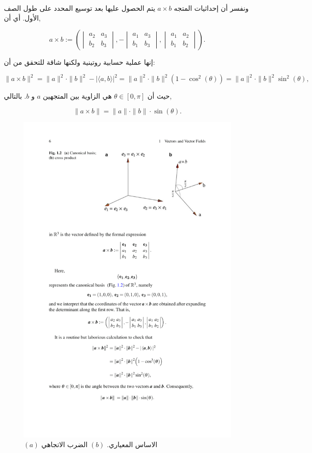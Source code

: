 ونفسر أن إحداثيات المتجه \( a \times b \) يتم الحصول عليها بعد توسيع المحدد على طول الصف الأول. أي أن,

\[ a \times b := \left( \begin{vmatrix} a_2 & a_3 \\ b_2 & b_3 \end{vmatrix}, -\begin{vmatrix} a_1 & a_3 \\ b_1 & b_3 \end{vmatrix}, \begin{vmatrix} a_1 & a_2 \\ b_1 & b_2 \end{vmatrix} \right). \]

إنها عملية حسابية روتينية ولكنها شاقة للتحقق من أن:

\[ \|a \times b\|^2 = \|a\|^2 \cdot \|b\|^2 - |\langle a, b \rangle|^2 = \|a\|^2 \cdot \|b\|^2 (1 - \cos^2(\theta)) = \|a\|^2 \cdot \|b\|^2 \sin^2(\theta), \]

حيث أن \( \theta \in [0, \pi] \) هي الزاوية بين المتجهين \( a \) و \( b \). بالتالي,

\[ \|a \times b\| = \|a\| \cdot \|b\| \cdot \sin(\theta). \]

\begin{figure}
    \centering
    \includegraphics[width=0.5\linewidth]{cross_product.pdf}
    \caption{$(a)$ الاساس المعياري.  $(b)$ الضرب الاتجاهي}
    \label{fig:enter-label}
\end{figure}

